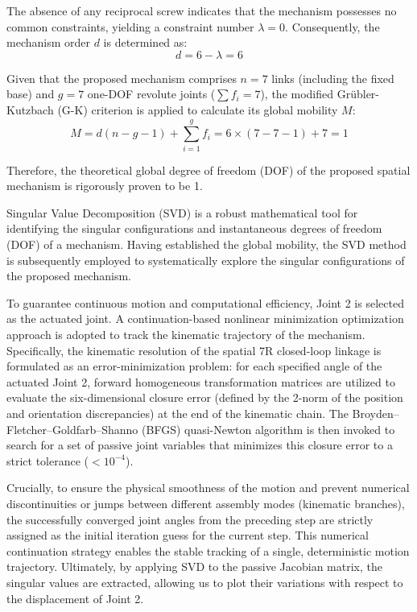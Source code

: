\documentclass[a4paper,fleqn]{cas-sc}
\begin{document}
The absence of any reciprocal screw indicates that the mechanism possesses no common constraints, yielding a constraint number $\lambda = 0$. Consequently, the mechanism order $d$ is determined as:
\begin{equation}
    d = 6 - \lambda = 6
\end{equation}

Given that the proposed mechanism comprises $n=7$ links (including the fixed base) and $g=7$ one-DOF revolute joints ($\sum f_i = 7$), the modified Grübler-Kutzbach (G-K) criterion is applied to calculate its global mobility $M$:
\begin{equation}
    M = d(n - g - 1) + \sum_{i=1}^{g} f_i = 6 \times (7 - 7 - 1) + 7 = 1
\end{equation}

Therefore, the theoretical global degree of freedom (DOF) of the proposed spatial mechanism is rigorously proven to be 1.

Singular Value Decomposition (SVD) is a robust mathematical tool for identifying the singular configurations and instantaneous degrees of freedom (DOF) of a mechanism. Having established the global mobility, the SVD method is subsequently employed to systematically explore the singular configurations of the proposed mechanism.

To guarantee continuous motion and computational efficiency, Joint 2 is selected as the actuated joint. A continuation-based nonlinear minimization optimization approach is adopted to track the kinematic trajectory of the mechanism. Specifically, the kinematic resolution of the spatial 7R closed-loop linkage is formulated as an error-minimization problem: for each specified angle of the actuated Joint 2, forward homogeneous transformation matrices are utilized to evaluate the six-dimensional closure error (defined by the 2-norm of the position and orientation discrepancies) at the end of the kinematic chain. The Broyden--Fletcher--Goldfarb--Shanno (BFGS) quasi-Newton algorithm is then invoked to search for a set of passive joint variables that minimizes this closure error to a strict tolerance ($< 10^{-4}$). 

Crucially, to ensure the physical smoothness of the motion and prevent numerical discontinuities or jumps between different assembly modes (kinematic branches), the successfully converged joint angles from the preceding step are strictly assigned as the initial iteration guess for the current step. This numerical continuation strategy enables the stable tracking of a single, deterministic motion trajectory. Ultimately, by applying SVD to the passive Jacobian matrix, the singular values are extracted, allowing us to plot their variations with respect to the displacement of Joint 2.
\end{document}
